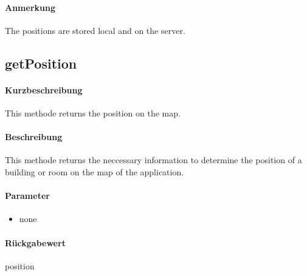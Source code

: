 \paragraph*{Anmerkung}
The positions are stored local and on the server.

\subsection{getPosition}%
\paragraph*{Kurzbeschreibung}
This methode returns the position on the map.
\paragraph*{Beschreibung}
This methode returns the neccessary information to determine the position of a building or room on the map of the application.
\paragraph*{Parameter}
\begin{itemize}
    \item none
\end{itemize}
\paragraph*{Rückgabewert}
position